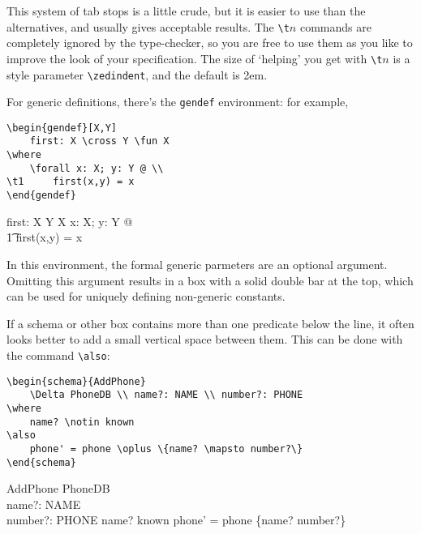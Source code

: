 \documentclass{article}
\def\gives{\endquote\endgroup\egroup}
\begin{document}
This system of tab stops is a little crude, but it is easier to use
than the alternatives, and usually gives acceptable results. The
\verb/\t/$n$ commands are completely ignored by the type-checker, 
so you are free to use them as you like to improve the look of your
specification.  The size of `helping' you get with
\verb/\t/$n$ is a style parameter \verb/\zedindent/, and the default
is 2em.

For generic definitions, there's the \verb/gendef/ environment: for
example,
\begin{demo}
\begin{verbatim}
\begin{gendef}[X,Y]
    first: X \cross Y \fun X
\where
    \forall x: X; y: Y @ \\
\t1     first(x,y) = x
\end{gendef}
\end{verbatim}
\gives
\begin{gendef}[X,Y]
    first: X \cross Y \fun X
\where
    \forall x: X; y: Y @ \\
\t1     first(x,y) = x
\end{gendef}
\end{demo}
In this environment, the formal generic parmeters are an optional
argument. Omitting this argument results in a box with a solid double
bar at the top, which can be used for uniquely defining non-generic
constants.

If a schema or other box contains more than one predicate below the
line, it often looks better to add a small vertical space between
them.  This can be done with the command \verb/\also/:
\begin{demo}
\begin{verbatim}
\begin{schema}{AddPhone}
    \Delta PhoneDB \\ name?: NAME \\ number?: PHONE
\where
    name? \notin known
\also
    phone' = phone \oplus \{name? \mapsto number?\}
\end{schema}
\end{verbatim}
\gives
\begin{schema}{AddPhone}
    \Delta PhoneDB \\ name?: NAME \\ number?: PHONE
\where
    name? \notin known
\also
    phone' = phone \oplus \{name? \mapsto number?\}
\end{schema}
\end{demo}
\end{document}
